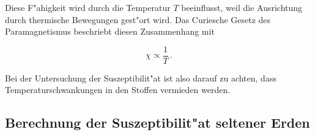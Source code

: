 	Diese F"ahigkeit wird durch die Temperatur $T$ beeinflusst, weil die Ausrichtung durch thermische Bewegungen gest"ort wird.
	Das Curiesche Gesetz des Paramagnetismus beschriebt diesen Zusammenhang mit

	\begin{equation*}
		\chi \propto \frac{1}{T}\,.
	\end{equation*}

	Bei der Untersuchung der Suszeptibilit"at ist also darauf zu achten, dass Temperaturschwankungen in den Stoffen vermieden werden.

	\subsection{Berechnung der Suszeptibilit"at seltener Erden}
		\label{subsec:berechnung}


